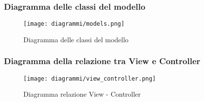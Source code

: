 \documentclass[a4paper, 10pt]{article}
\begin{document}
	\subsubsection{Diagramma delle classi del modello }	
		
		\begin{figure}[h]
				\centering
				\texttt{[image: diagrammi/models.png]}
				\caption{Diagramma delle classi del modello}
		\end{figure}\clearpage 
		
	\subsubsection{Diagramma della relazione tra View e Controller }	
		\begin{figure}[h]
				\centering
				\texttt{[image: diagrammi/view\_controller.png]}
				\caption{Diagramma relazione View - Controller}
		\end{figure}\clearpage 
	
\end{document}
